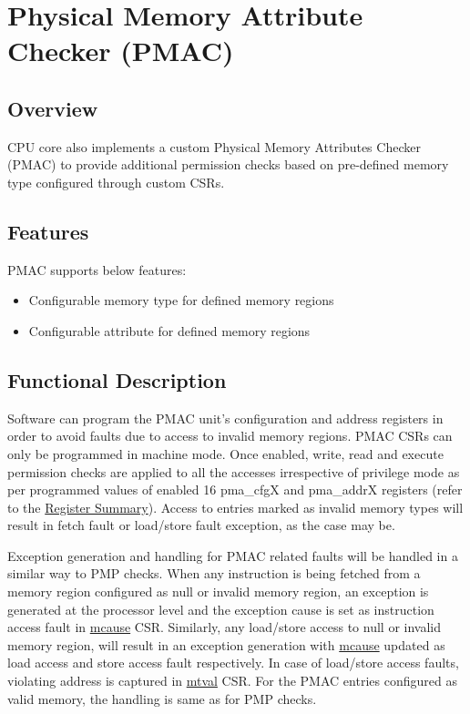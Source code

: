 \documentclass[main\_\_EN.tex]{subfiles}
\begin{document}
\clearpage
\section{Physical Memory Attribute Checker (PMAC)}
\label{sec:riscvcpu-pma}

\subsection{Overview}
\label{sec:riscvcpu-pma-overview}
CPU core also implements a custom Physical Memory Attributes Checker (PMAC) to provide additional permission checks based on pre-defined memory type configured through custom CSRs.


\subsection{Features}
\label{sec:riscvcpu-pma-features}
 PMAC supports below features:
 \begin{itemize}
    \item Configurable memory type for defined memory regions
    \item Configurable attribute for defined memory regions
\end{itemize}
\subsection{Functional Description}
\label{sec:riscvcpu-pma-func-descr}

Software can program the PMAC unit's configuration and address registers in order to avoid faults due to access to invalid memory regions. PMAC CSRs can only be programmed in machine mode. Once enabled, write, read and execute permission checks are applied to all the accesses irrespective of privilege mode as per programmed values of enabled 16 pma\_cfgX and pma\_addrX registers (refer to the \hyperref[sec:riscvcpu-pma-reg-summ]{Register Summary}). Access to entries marked as invalid memory types will result in fetch fault or load/store fault exception, as the case may be.

Exception generation and handling for PMAC related faults will be handled in a similar way to PMP checks. When any instruction is being fetched from a memory region configured as null or invalid memory region, an exception is generated at the processor level and the exception cause is set as instruction access fault in \hyperref[regdesc:MCAUSE]{mcause} CSR. Similarly, any load/store access to null or invalid memory region, will result in an exception generation with \hyperref[regdesc:MCAUSE]{mcause} updated as load access and store access fault respectively. In case of load/store access faults, violating address is captured in \hyperref[regdesc:MTVAL]{mtval} CSR. For the PMAC entries configured as valid memory, the handling is same as for PMP checks.
\end{document}
